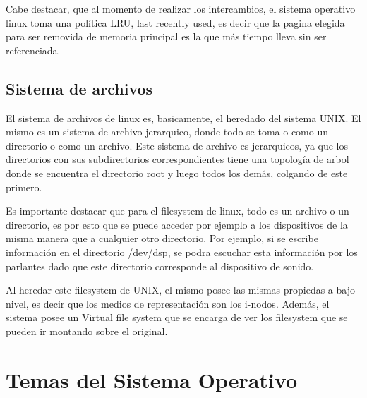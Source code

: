 \documentclass[a4paper, 12pt]{article}
\begin{document}
Cabe destacar, que al momento de realizar los intercambios, el sistema operativo linux toma una pol\'itica LRU, last recently used, es decir que la pagina elegida para ser removida de memoria principal es la que m\'as tiempo lleva sin ser referenciada.

\subsection*{Sistema de archivos}

El sistema de archivos de linux es, basicamente, el heredado del sistema UNIX. El mismo es un sistema de archivo jerarquico, donde todo se toma o como un directorio o como un archivo. Este sistema de archivo es jerarquicos, ya que los directorios con sus subdirectorios correspondientes tiene una topolog\'ia de arbol donde se encuentra el directorio root y luego todos los dem\'as, colgando de este primero. 

Es importante destacar que para el filesystem de linux, todo es un archivo o un directorio, es por esto que se puede acceder por ejemplo a los dispositivos de la misma manera que a cualquier otro directorio. Por ejemplo, si se escribe informaci\'on en el directorio /dev/dsp, se podra escuchar esta informaci\'on por los parlantes dado que este directorio corresponde al dispositivo de sonido.

Al heredar este filesystem de UNIX, el mismo posee las mismas propiedas a bajo nivel, es decir que los medios de representaci\'on son los i-nodos. Adem\'as, el sistema posee un Virtual file system que se encarga de ver los filesystem que se pueden ir montando sobre el original. 


\section*{Temas del Sistema Operativo}
\end{document}
